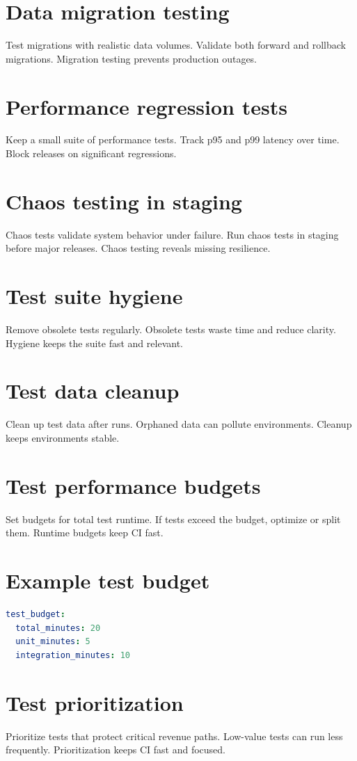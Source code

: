 \section{Data migration testing}
Test migrations with realistic data volumes.
Validate both forward and rollback migrations.
Migration testing prevents production outages.

\section{Performance regression tests}
Keep a small suite of performance tests.
Track p95 and p99 latency over time.
Block releases on significant regressions.

\section{Chaos testing in staging}
Chaos tests validate system behavior under failure.
Run chaos tests in staging before major releases.
Chaos testing reveals missing resilience.

\section{Test suite hygiene}
Remove obsolete tests regularly.
Obsolete tests waste time and reduce clarity.
Hygiene keeps the suite fast and relevant.

\section{Test data cleanup}
Clean up test data after runs.
Orphaned data can pollute environments.
Cleanup keeps environments stable.

\section{Test performance budgets}
Set budgets for total test runtime.
If tests exceed the budget, optimize or split them.
Runtime budgets keep CI fast.

\section{Example test budget}
\begin{lstlisting}[language=YAML]
test_budget:
  total_minutes: 20
  unit_minutes: 5
  integration_minutes: 10
\end{lstlisting}

\section{Test prioritization}
Prioritize tests that protect critical revenue paths.
Low-value tests can run less frequently.
Prioritization keeps CI fast and focused.

